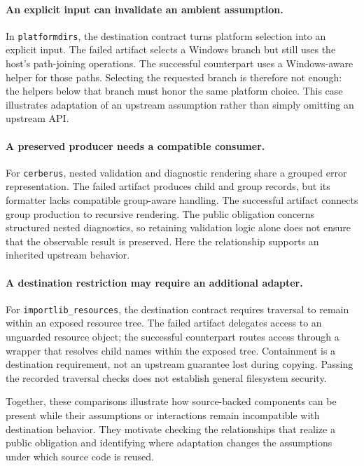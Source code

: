 \documentclass[acmsmall,screen,review,anonymous]{acmart}
\begin{document}
\paragraph{An explicit input can invalidate an ambient assumption.}
In \texttt{platformdirs}, the destination contract turns platform selection into
an explicit input. The failed artifact selects a Windows branch but still uses
the host's path-joining operations. The successful counterpart uses a
Windows-aware helper for those paths. Selecting the requested branch is therefore
not enough: the helpers below that branch must honor the same platform choice.
This case illustrates adaptation of an upstream assumption rather than simply
omitting an upstream API.

\paragraph{A preserved producer needs a compatible consumer.}
For \texttt{cerberus}, nested validation and diagnostic rendering share a grouped
error representation. The failed artifact produces child and group records,
but its formatter lacks compatible group-aware handling. The successful artifact
connects group production to recursive rendering. The public obligation concerns
structured nested diagnostics, so retaining validation logic alone does not
ensure that the observable result is preserved. Here the relationship supports
an inherited upstream behavior.

\paragraph{A destination restriction may require an additional adapter.}
For \texttt{importlib\_resources}, the destination contract requires traversal to
remain within an exposed resource tree. The failed artifact delegates access to
an unguarded resource object; the successful counterpart routes access through
a wrapper that resolves child names within the exposed tree. Containment is a
destination requirement, not an upstream guarantee lost during copying.
Passing the recorded traversal checks does not establish general filesystem
security.

Together, these comparisons illustrate how source-backed components can be
present while their assumptions or interactions remain incompatible with
destination behavior. They motivate checking the relationships that realize a
public obligation and identifying where adaptation changes the assumptions
under which source code is reused.
\end{document}
